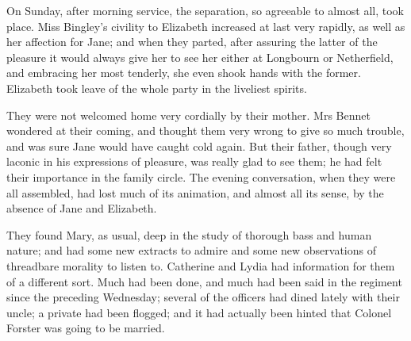 On Sunday, after morning service, the separation, so agreeable to almost all, took place. Miss Bingley's civility to Elizabeth increased at last very rapidly, as well as her affection for Jane; and when they parted, after assuring the latter of the pleasure it would always give her to see her either at Longbourn or Netherfield, and embracing her most tenderly, she even shook hands with the former. Elizabeth took leave of the whole party in the liveliest spirits.

They were not welcomed home very cordially by their mother. Mrs Bennet wondered at their coming, and thought them very wrong to give so much trouble, and was sure Jane would have caught cold again. But their father, though very laconic in his expressions of pleasure, was really glad to see them; he had felt their importance in the family circle. The evening conversation, when they were all assembled, had lost much of its animation, and almost all its sense, by the absence of Jane and Elizabeth.

They found Mary, as usual, deep in the study of thorough bass and human nature; and had some new extracts to admire and some new observations of threadbare morality to listen to. Catherine and Lydia had information for them of a different sort. Much had been done, and much had been said in the regiment since the preceding Wednesday; several of the officers had dined lately with their uncle; a private had been flogged; and it had actually been hinted that Colonel Forster was going to be married.